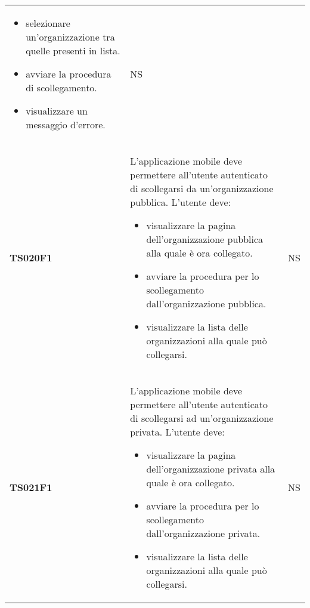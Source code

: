 \documentclass[../piano-di-qualifica.tex]{subfiles}
\begin{document}
\begin{centering}
\begin{longtable}[H]{>{\centering\bfseries}m{3cm} >{}p{10cm} >{\centering\arraybackslash}m{3cm}}
\begin{itemize}
      \item selezionare un'organizzazione tra quelle presenti in lista.
      \item avviare la procedura di scollegamento.
      \item visualizzare un messaggio d'errore.
    \end{itemize}
                       & NS                                                                                                                                                                                                                                                               \\
    TS020F1            & L'applicazione mobile deve permettere all'utente autenticato di scollegarsi da un'organizzazione pubblica. \newline
    L'utente deve:
    \begin{itemize}
      \item visualizzare la pagina dell'organizzazione pubblica alla quale è ora collegato.
      \item avviare la procedura per lo scollegamento dall'organizzazione pubblica.
      \item visualizzare la lista delle organizzazioni alla quale può collegarsi.
    \end{itemize}
                       & NS                                                                                                                                                                                                                                                               \\
    TS021F1            & L'applicazione mobile deve permettere all'utente autenticato di scollegarsi ad un'organizzazione privata. \newline
    L'utente deve:
    \begin{itemize}
      \item visualizzare la pagina dell'organizzazione privata alla quale è ora collegato.
      \item avviare la procedura per lo scollegamento dall'organizzazione privata.
      \item visualizzare la lista delle organizzazioni alla quale può collegarsi.
    \end{itemize}
                       & NS                                                                                                                                                                                                                                                               \\

\end{longtable}
\end{centering}
\end{document}
